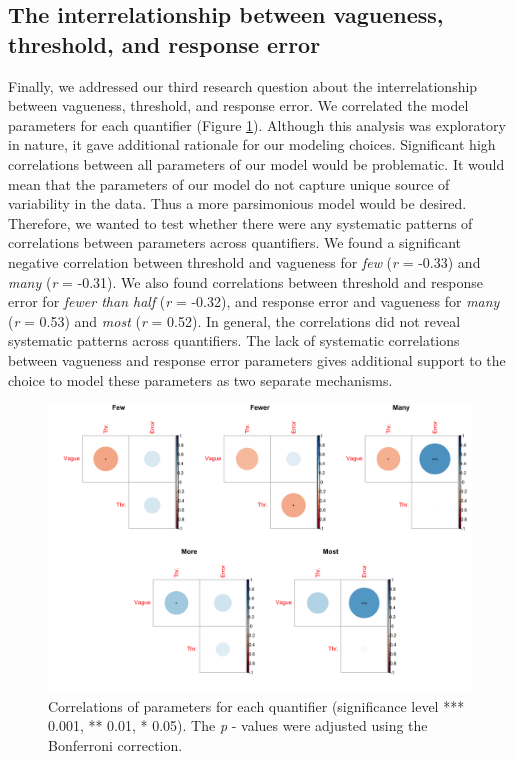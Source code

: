 \documentclass{article}
\begin{document}
\subsection{The interrelationship between vagueness, threshold, and response error}
Finally, we addressed our third research question about the interrelationship between vagueness, threshold, and response error. We correlated the model parameters for each quantifier (Figure \ref{fig:fig2.4}). Although this analysis was exploratory in nature, it gave additional rationale for our modeling choices. Significant high correlations between all parameters of our model would be problematic. It would mean that the parameters of our model do not capture unique source of variability in the data. Thus a more parsimonious model would be desired. Therefore, we wanted to test whether there were any systematic patterns of correlations between parameters across quantifiers. We found a significant negative correlation between threshold and vagueness for \textit{few} (\textit{r} = -0.33) and \textit{many} (\textit{r} = -0.31). We also found correlations between threshold and response error for \textit{fewer than half} (\textit{r} = -0.32), and response error and vagueness for \textit{many} (\textit{r} = 0.53) and \textit{most} (\textit{r} = 0.52). In general, the correlations did not reveal systematic patterns across quantifiers. The lack of systematic correlations between vagueness and response error parameters gives additional support to the choice to model these parameters as two separate mechanisms.

\begin{figure} [H]
    \centering
    \includegraphics[width=\textwidth]{Figure2.4.png}
    \caption{Correlations of parameters for each quantifier (significance level *** 0.001, ** 0.01, * 0.05). The \textit{p} - values were adjusted using the Bonferroni correction.}
    \label{fig:fig2.4}
\end{figure}
\end{document}
